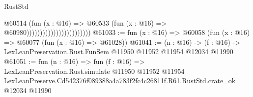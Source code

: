 \begin{lexlean}{RustStd}
\begin{coremodule}
                                              @60514
                                                (fun (x : @16) =>
                                                @60533
                                                  (fun (x : @16) => @60980))))))))))))))))))))))))
@61033 := fun (x : @16) => @60058 (fun (x : @16) => @60077 (fun (x : @16) => @61028))
@61041 := (n : @16) ->
  (f : @16) -> LexLeanPreservation.Rust.FunSem @11950 @11952 @11954 @12034 @11990
@61051 := fun (n : @16) =>
  fun (f : @16) =>
  LexLeanPreservation.Rust.simulate
    @11950
    @11952
    @11954
    LexLeanPreserve.Cd542376f089388a4a783f2fc4c26811f.R61.RustStd.crate_ok
    @12034
    @11990
\end{coremodule}
\end{lexlean}
